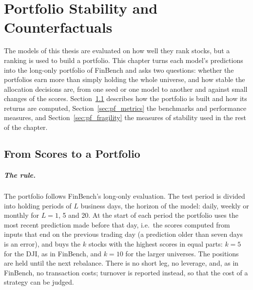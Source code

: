 
\chapter{Portfolio Stability and Counterfactuals}
\label{ch:portfolio}

The models of this thesis are evaluated on how well they rank stocks, but a ranking is used to build a portfolio. This chapter turns each model's predictions into the long-only portfolio of FinBench and asks two questions: whether the portfolios earn more than simply holding the whole universe, and how stable the allocation decisions are, from one seed or one model to another and against small changes of the scores. Section~\ref{sec:pf_protocol} describes how the portfolio is built and how its returns are computed, Section~\ref{sec:pf_metrics} the benchmarks and performance measures, and Section~\ref{sec:pf_fragility} the measures of stability used in the rest of the chapter.

\section{From Scores to a Portfolio}
\label{sec:pf_protocol}

\paragraph{The rule.} The portfolio follows FinBench's long-only evaluation. The test period is divided into holding periods of $L$ business days, the horizon of the model: daily, weekly or monthly for $L = 1$, 5 and 20. At the start of each period the portfolio uses the most recent prediction made before that day, i.e.\ the scores computed from inputs that end on the previous trading day (a prediction older than seven days is an error), and buys the $k$ stocks with the highest scores in equal parts: $k = 5$ for the DJI, as in FinBench, and $k = 10$ for the larger universes. The positions are held until the next rebalance. There is no short leg, no leverage, and, as in FinBench, no transaction costs; turnover is reported instead, so that the cost of a strategy can be judged.

